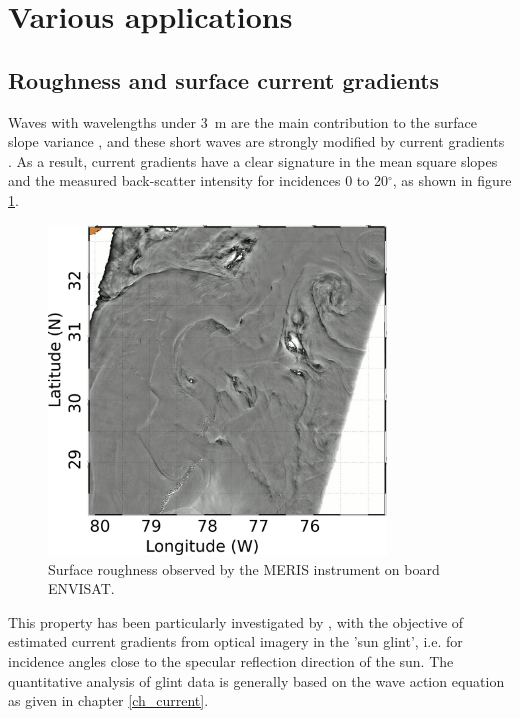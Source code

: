 \section{Various applications}
\subsection{Roughness and surface current gradients}
Waves with wavelengths under 3~m are the main contribution to the surface slope variance \citep[e.g.][]{Cox&Munk1954,Vandemark&al.2002}, and 
these short waves are strongly modified by current gradients \citep[e.g.][]{Phillips1984}. As a result, current gradients have a clear signature in the mean 
square slopes and the measured back-scatter intensity for incidences 0 to 20$^\circ$, as shown in figure \ref{fig:glint}. 
\begin{figure}
\centerline{\includegraphics[width=0.8\textwidth]{FIGS_CH_REMOTE/sun_glint.jpg}}
  \caption{Surface roughness observed by the MERIS instrument on board ENVISAT.}
  \label{fig:glint}
\end{figure}
This property has been particularly investigated by 
\cite{Kudryavtsev&al.2012,Rascle&al.2014,Rascle&al.2017}, with the objective of estimated current gradients from optical imagery in the 'sun glint', i.e. 
for incidence angles close to the specular reflection direction of the sun.  The quantitative analysis of glint data is generally based on the wave action equation 
as given in chapter \ref{ch_current}.

